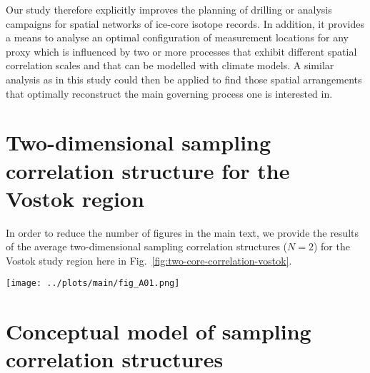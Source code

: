 \documentclass[cp, manuscript]{copernicus}
\begin{document}
Our study therefore explicitly improves the planning of drilling or analysis
campaigns for spatial networks of ice-core isotope records. In addition, it
provides a means to analyse an optimal configuration of measurement locations
for any proxy which is influenced by two or more processes that exhibit different
spatial correlation scales and that can be modelled with climate models. A
similar analysis as in this study could then be applied to find those spatial
arrangements that optimally reconstruct the main governing process one is
interested in.


\appendix

\section{Two-dimensional sampling correlation structure for the Vostok region}
\label{app:vostok.n2}

In order to reduce the number of figures in the main text, we provide the
results of the average two-dimensional sampling correlation structures ($N=2$)
for the Vostok study region here in Fig.~\ref{fig:two-core-correlation-vostok}.

\begin{figure*}[t]%
\centering
\texttt{[image: ../plots/main/fig\_A01.png]}
\caption{%
  Sampling correlation structure with temperature in the two-dimensional case of
  sampling two locations in the Vostok region. Shown is the mean correlation of
  all possible single correlations for the average of two grid cells of
  (\textbf{a}) $T_{\mathrm{2m}}$, (\textbf{b}) $T_{\mathrm{2m}}^{\mathrm{(pw)}}$
  and (\textbf{c}) $\delta^{18}\mathrm{O}^{\mathrm{(pw)}}$ time series sampled
  from the same ring or from two different rings, averaged over all target sites
  in the given region. The axes display the distance from the target site, where
  the $x$ ($y$) axis represents for the first (second) sampled ring and the tick
  marks indicate the midpoint radii of the rings. Note that for
  $\delta^{18}\mathrm{O}^{\mathrm{(pw)}}$ the -- albeit marginal -- correlation
  maximum is achieved by combining the innermost ring with the ring between
  $500$--$750$\,km.}
\label{fig:two-core-correlation-vostok}%
\end{figure*}%

\section{Conceptual model of sampling correlation structures}
\label{app:concept.model}
\end{document}
